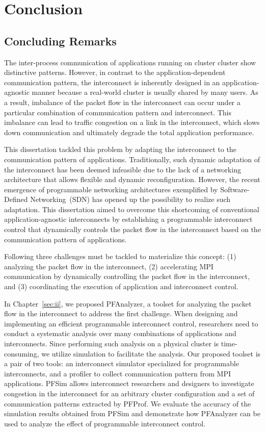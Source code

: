 \chapter{Conclusion}\label{sec:v}

\section{Concluding Remarks}

The inter-process communication of applications running on cluster cluster
show distinctive patterns. However, in contrast to the application-dependent
communication pattern, the interconnect is inherently designed in an
application-agnostic manner because a real-world cluster is usually shared by
many users. As a result, imbalance of the packet flow in the interconnect can
occur under a particular combination of communication pattern and
interconnect. This imbalance can lead to traffic congestion on a link in the
interconnect, which slows down communication and ultimately degrade the
total application performance.

This dissertation tackled this problem by adapting the interconnect to the
communication pattern of applications. Traditionally, such dynamic adaptation
of the interconnect has been deemed infeasible due to the lack of a networking
architecture that allows flexible and dynamic reconfiguration. However, the
recent emergence of programmable networking architectures exemplified by
Software-Defined Networking~(SDN) has opened up the possibility to realize
such adaptation. This dissertation aimed to overcome this shortcoming of
conventional application-agnostic interconnects by establishing a programmable
interconnect control that dynamically controls the packet flow in the
interconnect based on the communication pattern of applications.

Following three challenges must be tackled to materialize this concept: (1)
analyzing the packet flow in the interconnect, (2) accelerating MPI
communication by dynamically controlling the packet flow in the interconnect,
and (3) coordinating the execution of application and interconnect control.

In Chapter~\ref{sec:ii},  we proposed PFAnalyzer, a toolset for analyzing the
packet flow in the interconnect to address the first challenge. When designing
and implementing an efficient programmable interconnect control, researchers
need to conduct a systematic analysis over many combinations of applications
and interconnects. Since performing such analysis on a physical cluster is
time-consuming, we utilize simulation to facilitate the analysis. Our proposed
toolset is a pair of two tools: an interconnect simulator specialized for
programmable interconnects, and a profiler to collect communication pattern
from MPI applications. PFSim allows interconnect researchers and designers to
investigate congestion in the interconnect for an arbitrary cluster
configuration and a set of communication patterns extracted by PFProf. We
evaluate the accuracy of the simulation results obtained from PFSim and
demonstrate how PFAnalyzer can be used to analyze the effect of programmable
interconnect control.

